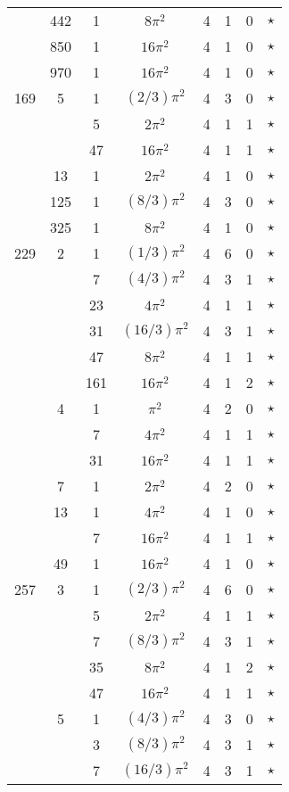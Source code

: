 \documentclass[12pt]{amsart}
\begin{document}
\begin{tabular}{ccc|ccccc}
 & 442 & 1 & $8\pi^2$ & 4 & 1 & 0 & $\star$ \\
 & 850 & 1 & $16\pi^2$ & 4 & 1 & 0 & $\star$ \\
 & 970 & 1 & $16\pi^2$ & 4 & 1 & 0 & $\star$ \\
169 & 5 & 1 & $(2/3)\pi^2$ & 4 & 3 & 0 & $\star$ \\
 &  & 5 & $2\pi^2$ & 4 & 1 & 1 & $\star$ \\
 &  & 47 & $16\pi^2$ & 4 & 1 & 1 & $\star$ \\
 & 13 & 1 & $2\pi^2$ & 4 & 1 & 0 & $\star$ \\
 & 125 & 1 & $(8/3)\pi^2$ & 4 & 3 & 0 & $\star$ \\
 & 325 & 1 & $8\pi^2$ & 4 & 1 & 0 & $\star$ \\
229 & 2 & 1 & $(1/3)\pi^2$ & 4 & 6 & 0 & $\star$ \\
 &  & 7 & $(4/3)\pi^2$ & 4 & 3 & 1 & $\star$ \\
 &  & 23 & $4\pi^2$ & 4 & 1 & 1 & $\star$ \\
 &  & 31 & $(16/3)\pi^2$ & 4 & 3 & 1 & $\star$ \\
 &  & 47 & $8\pi^2$ & 4 & 1 & 1 & $\star$ \\
 &  & 161 & $16\pi^2$ & 4 & 1 & 2 & $\star$ \\
 & 4 & 1 & $\pi^2$ & 4 & 2 & 0 & $\star$ \\
 &  & 7 & $4\pi^2$ & 4 & 1 & 1 & $\star$ \\
 &  & 31 & $16\pi^2$ & 4 & 1 & 1 & $\star$ \\
 & 7 & 1 & $2\pi^2$ & 4 & 2 & 0 & $\star$ \\
 & 13 & 1 & $4\pi^2$ & 4 & 1 & 0 & $\star$ \\
 &  & 7 & $16\pi^2$ & 4 & 1 & 1 & $\star$ \\
 & 49 & 1 & $16\pi^2$ & 4 & 1 & 0 & $\star$ \\
257 & 3 & 1 & $(2/3)\pi^2$ & 4 & 6 & 0 & $\star$ \\
 &  & 5 & $2\pi^2$ & 4 & 1 & 1 & $\star$ \\
 &  & 7 & $(8/3)\pi^2$ & 4 & 3 & 1 & $\star$ \\
 &  & 35 & $8\pi^2$ & 4 & 1 & 2 & $\star$ \\
 &  & 47 & $16\pi^2$ & 4 & 1 & 1 & $\star$ \\
 & 5 & 1 & $(4/3)\pi^2$ & 4 & 3 & 0 & $\star$ \\
 &  & 3 & $(8/3)\pi^2$ & 4 & 3 & 1 & $\star$ \\
 &  & 7 & $(16/3)\pi^2$ & 4 & 3 & 1 & $\star$ \\

\end{tabular}
\end{document}
